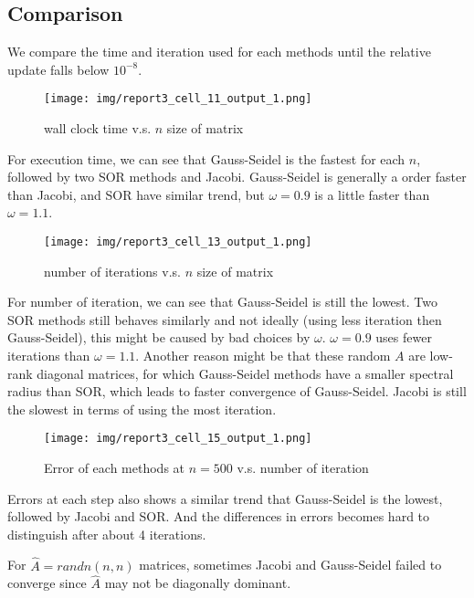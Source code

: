 \documentclass[a4paper,12pt]{article}
\begin{document}
\subsection{Comparison}

We compare the time and iteration used for each methods until the relative update falls below $10^{-8}$.
\begin{figure}[H]
    \centering
    \texttt{[image: img/report3\_cell\_11\_output\_1.png]}
    \caption{wall clock time v.s. $n$ size of matrix}
    \label{fig:0}   
\end{figure}

For execution time,
we can see that Gauss-Seidel is the fastest for each $n$,
followed by two SOR methods and Jacobi.
Gauss-Seidel is generally a order faster than Jacobi,
and SOR have similar trend, but $\omega = 0.9$ is a little faster than $\omega = 1.1$.

\begin{figure}[H]
    \centering
    \texttt{[image: img/report3\_cell\_13\_output\_1.png]}
    \caption{number of iterations v.s. $n$ size of matrix}
    \label{fig:1}   
\end{figure}

For number of iteration,
we can see that Gauss-Seidel is still the lowest.
Two SOR methods still behaves similarly and not ideally (using less iteration then Gauss-Seidel),
this might be caused by bad choices by $\omega$.
$\omega=0.9$ uses fewer iterations than $\omega=1.1$.
Another reason might be that these random $A$ are low-rank diagonal matrices,
for which Gauss-Seidel methods have a smaller spectral radius than SOR,
which leads to faster convergence of Gauss-Seidel.
Jacobi is still the slowest in terms of using the most iteration.

\begin{figure}[H]
    \centering
    \texttt{[image: img/report3\_cell\_15\_output\_1.png]}
    \caption{Error of each methods at $n = 500$ v.s. number of iteration}
    \label{fig:2}   
\end{figure}

Errors at each step also shows a similar trend that Gauss-Seidel is the lowest,
followed by Jacobi and SOR.
And the differences in errors becomes hard to distinguish after about 4 iterations.

For $\hat{A} = randn(n, n)$ matrices,
sometimes Jacobi and Gauss-Seidel failed to converge since $\hat{A}$ may not be diagonally dominant.
\end{document}
